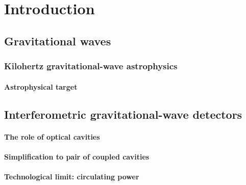 \chapter{Introduction} %

\section{Gravitational waves}


\subsection{Kilohertz gravitational-wave astrophysics} %


\subsubsection{Astrophysical target}



\section{Interferometric gravitational-wave detectors}



\subsubsection{The role of optical cavities}


\subsubsection{Simplification to pair of coupled cavities}


\subsubsection{Technological limit: circulating power}

